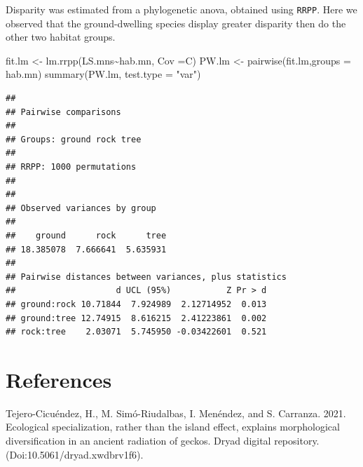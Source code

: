 \documentclass[
  11pt,
]{article}
\newenvironment{Shaded}{\begin{snugshade}}{\end{snugshade}}
\newcommand{\AttributeTok}[1]{\textcolor[rgb]{0.77,0.63,0.00}{#1}}
\newcommand{\FunctionTok}[1]{\textcolor[rgb]{0.00,0.00,0.00}{#1}}
\newcommand{\NormalTok}[1]{#1}
\newcommand{\OtherTok}[1]{\textcolor[rgb]{0.56,0.35,0.01}{#1}}
\newcommand{\SpecialCharTok}[1]{\textcolor[rgb]{0.00,0.00,0.00}{#1}}
\newcommand{\StringTok}[1]{\textcolor[rgb]{0.31,0.60,0.02}{#1}}
\newlength{\cslhangindent}
\newlength{\cslentryspacingunit} %
\newenvironment{CSLReferences}[2] %
 {%
  \setlength{\parindent}{0pt}
  \ifodd #1
  \let\oldpar\par
  \def\par{\hangindent=\cslhangindent\oldpar}
  \fi
  \setlength{\parskip}{#2\cslentryspacingunit}
 }%
 {}
\begin{document}
Disparity was estimated from a phylogenetic anova, obtained using
\texttt{RRPP}. Here we observed that the ground-dwelling species display
greater disparity then do the other two habitat groups.

\begin{Shaded}
\begin{Highlighting}[]
\NormalTok{fit.lm }\OtherTok{\textless{}{-}} \FunctionTok{lm.rrpp}\NormalTok{(LS.mns}\SpecialCharTok{\textasciitilde{}}\NormalTok{hab.mn, }\AttributeTok{Cov =}\NormalTok{C)}
\NormalTok{PW.lm }\OtherTok{\textless{}{-}} \FunctionTok{pairwise}\NormalTok{(fit.lm,}\AttributeTok{groups =}\NormalTok{ hab.mn)}
\FunctionTok{summary}\NormalTok{(PW.lm, }\AttributeTok{test.type =} \StringTok{"var"}\NormalTok{)}
\end{Highlighting}
\end{Shaded}

\begin{verbatim}
## 
## Pairwise comparisons
## 
## Groups: ground rock tree 
## 
## RRPP: 1000 permutations
## 
## 
## Observed variances by group
## 
##    ground      rock      tree 
## 18.385078  7.666641  5.635931 
## 
## Pairwise distances between variances, plus statistics
##                    d UCL (95%)           Z Pr > d
## ground:rock 10.71844  7.924989  2.12714952  0.013
## ground:tree 12.74915  8.616215  2.41223861  0.002
## rock:tree    2.03071  5.745950 -0.03422601  0.521
\end{verbatim}

\newpage

\hypertarget{references}{%
\section*{References}\label{references}}

\setlength{\parindent}{-0.25in} \setlength{\leftskip}{0.25in}
\setlength{\parskip}{8pt} \noindent

\hypertarget{refs}{}
\begin{CSLReferences}{1}{0}
\leavevmode{}%
Tejero-Cicuéndez, H., M. Simó-Riudalbas, I. Menéndez, and S. Carranza.
2021. Ecological specialization, rather than the island effect, explains
morphological diversification in an ancient radiation of geckos. Dryad
digital repository. (Doi:10.5061/dryad.xwdbrv1f6).

\end{CSLReferences}

\newpage
\end{document}

